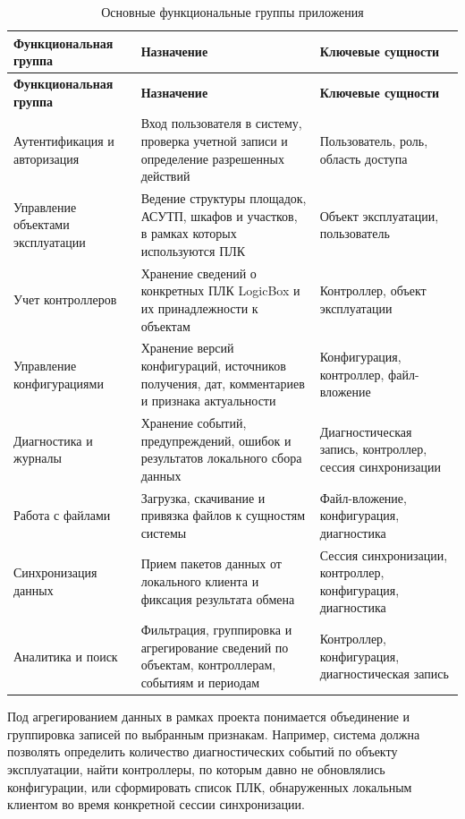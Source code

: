 \small
\begin{longtable}{|p{}|p{}|p{}|}
    \caption{Основные функциональные группы приложения} \label{tab:function_groups} \\
    \hline
    \textbf{Функциональная группа} & \textbf{Назначение} & \textbf{Ключевые сущности} \\ \hline
    \endfirsthead

    \tabcont{\ref{tab:function_groups}}
    \textbf{Функциональная группа} & \textbf{Назначение} & \textbf{Ключевые сущности} \\ \hline
    \endhead

    \hline
    \endfoot

    \hline
    \endlastfoot

    Аутентификация и авторизация & Вход пользователя в систему, проверка учетной записи и определение разрешенных действий & Пользователь, роль, область доступа \\ \hline
    Управление объектами эксплуатации & Ведение структуры площадок, АСУТП, шкафов и участков, в рамках которых используются ПЛК & Объект эксплуатации, пользователь \\ \hline
    Учет контроллеров & Хранение сведений о конкретных ПЛК LogicBox и их принадлежности к объектам & Контроллер, объект эксплуатации \\ \hline
    Управление конфигурациями & Хранение версий конфигураций, источников получения, дат, комментариев и признака актуальности & Конфигурация, контроллер, файл-вложение \\ \hline
    Диагностика и журналы & Хранение событий, предупреждений, ошибок и результатов локального сбора данных & Диагностическая запись, контроллер, сессия синхронизации \\ \hline
    Работа с файлами & Загрузка, скачивание и привязка файлов к сущностям системы & Файл-вложение, конфигурация, диагностика \\ \hline
    Синхронизация данных & Прием пакетов данных от локального клиента и фиксация результата обмена & Сессия синхронизации, контроллер, конфигурация, диагностика \\ \hline
    Аналитика и поиск & Фильтрация, группировка и агрегирование сведений по объектам, контроллерам, событиям и периодам & Контроллер, конфигурация, диагностическая запись \\ \hline
\end{longtable}
\normalsize

Под агрегированием данных в рамках проекта понимается объединение и группировка
записей по выбранным признакам. Например, система должна позволять определить
количество диагностических событий по объекту эксплуатации, найти контроллеры,
по которым давно не обновлялись конфигурации, или сформировать список ПЛК,
обнаруженных локальным клиентом во время конкретной сессии синхронизации.


